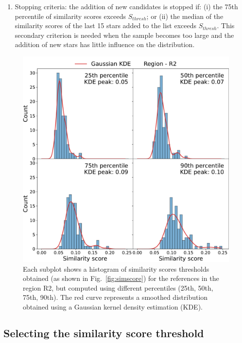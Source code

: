 \documentclass{aa}
\begin{document}
\begin{enumerate}
    \item Stopping criteria: the addition of new candidates is stopped if: (i) the 75th percentile of similarity scores exceeds $S_{thresh}$; or (ii) the median of the similarity scores of the last 15 stars added to the list exceeds $S_{thresh}$. This secondary criterion is needed when the sample becomes too large and the addition of new stars has little influence on the distribution. 
\end{enumerate}


\begin{figure}[t]
  \centering
  \includegraphics[width=\linewidth]{Plots/simil_thresh_hists/simil_thresh_histograms_R2_ges.pdf}
  \caption{Each subplot shows a histogram of similarity scores thresholds obtained (as shown in Fig.~\ref{fig:simscore}) for the references in the region R2, but computed using different percentiles (25th, 50th, 75th, 90th). The red curve represents a smoothed distribution obtained using a Gaussian kernel density estimation (KDE).}
  \label{fig:R2threshold_hist}
\end{figure}

\subsection{Selecting the similarity score threshold}\label{sec:testing}
\end{document}
